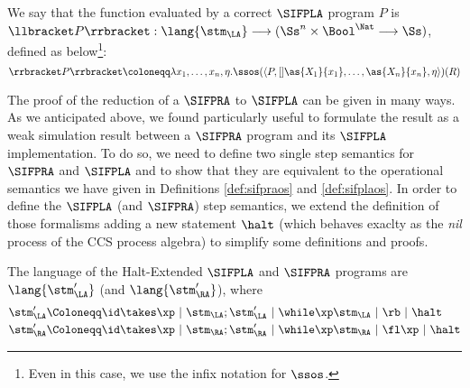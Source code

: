 \begin{defn}
  \label{def:simplafuneval}
We say that the function evaluated by a correct $\SIFPLA$ program $P$ is $\mathcal \llbracket P\rrbracket: \lang{\stm_\LA} \longrightarrow (\Ss^n \times \Bool^\Nat \longrightarrow \Ss)$, defined as below\footnote{Even in this case, we use the infix notation for $\ssos$.}:
\[
\rrbracket P\rrbracket\coloneqq \lambda x_1, \ldots, x_n, \eta.\ssos(\langle P, []\as {X_1} {x_1}, \ldots, \as {X_n} {x_n}, \eta\rangle)(R)
\]
\end{defn}


The proof of the reduction of a $\SIFPRA$ to $\SIFPLA$ can be given in many ways.
As we anticipated above, we found particularly useful to formulate the result as a
weak simulation result between a $\SIFPRA$ program and its $\SIFPLA$
implementation.
%
To do so, we need to define two single step semantics for $\SIFPRA$ and $\SIFPLA$
and to show that they are equivalent to the operational semantics we have given
in Definitions \ref{def:sifpraos} and \ref{def:sifplaos}.
%
In order to define the $\SIFPLA$ (and $\SIFPRA$) step semantics,
we extend the definition of those formalisms adding a new statement $\halt$
(which behaves exaclty as the \emph{nil} process of the CCS process algebra)
to simplify some definitions and proofs.

\begin{defn}
  The language of the Halt-Extended $\SIFPLA$ and $\SIFPRA$ programs
  are $\lang{\stm_\LA'}$ (and $\lang{\stm_\RA'}$), where
  \begin{align*}
    \stm_\LA' & \Coloneqq \id \takes \xp\ |\ \stm_\LA;\stm_\LA'\ |\ \while \xp \stm_\LA\ |\ \rb\ |\ \halt\\
    \stm_\RA' & \Coloneqq \id \takes \xp\ |\ \stm_\RA;\stm_\RA'\ |\ \while \xp \stm_\RA\ |\ \fl \xp\ |\ \halt\\
  \end{align*}
\end{defn}

